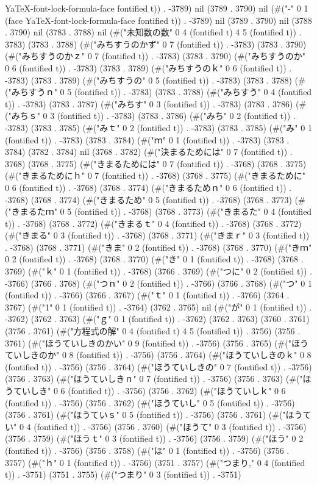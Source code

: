 YaTeX-font-lock-formula-face fontified t)) . -3789) nil (3789 . 3790) nil (#("-" 0 1 (face YaTeX-font-lock-formula-face fontified t)) . -3789) nil (3789 . 3790) nil (3788 . 3790) nil (3783 . 3788) nil (#("未知数の数" 0 4 (fontified t) 4 5 (fontified t)) . 3783) (3783 . 3788) (#("みちすうのかず" 0 7 (fontified t)) . -3783) (3783 . 3790) (#("みちすうのかｚ" 0 7 (fontified t)) . -3783) (3783 . 3790) (#("みちすうのか" 0 6 (fontified t)) . -3783) (3783 . 3789) (#("みちすうのｋ" 0 6 (fontified t)) . -3783) (3783 . 3789) (#("みちすうの" 0 5 (fontified t)) . -3783) (3783 . 3788) (#("みちすうｎ" 0 5 (fontified t)) . -3783) (3783 . 3788) (#("みちすう" 0 4 (fontified t)) . -3783) (3783 . 3787) (#("みちす" 0 3 (fontified t)) . -3783) (3783 . 3786) (#("みちｓ" 0 3 (fontified t)) . -3783) (3783 . 3786) (#("みち" 0 2 (fontified t)) . -3783) (3783 . 3785) (#("みｔ" 0 2 (fontified t)) . -3783) (3783 . 3785) (#("み" 0 1 (fontified t)) . -3783) (3783 . 3784) (#("ｍ" 0 1 (fontified t)) . -3783) (3783 . 3784) (3782 . 3784) nil (3768 . 3782) (#("決まるためには" 0 7 (fontified t)) . 3768) (3768 . 3775) (#("きまるためには" 0 7 (fontified t)) . -3768) (3768 . 3775) (#("きまるためにｈ" 0 7 (fontified t)) . -3768) (3768 . 3775) (#("きまるために" 0 6 (fontified t)) . -3768) (3768 . 3774) (#("きまるためｎ" 0 6 (fontified t)) . -3768) (3768 . 3774) (#("きまるため" 0 5 (fontified t)) . -3768) (3768 . 3773) (#("きまるたｍ" 0 5 (fontified t)) . -3768) (3768 . 3773) (#("きまるた" 0 4 (fontified t)) . -3768) (3768 . 3772) (#("きまるｔ" 0 4 (fontified t)) . -3768) (3768 . 3772) (#("きまる" 0 3 (fontified t)) . -3768) (3768 . 3771) (#("きまｒ" 0 3 (fontified t)) . -3768) (3768 . 3771) (#("きま" 0 2 (fontified t)) . -3768) (3768 . 3770) (#("きｍ" 0 2 (fontified t)) . -3768) (3768 . 3770) (#("き" 0 1 (fontified t)) . -3768) (3768 . 3769) (#("ｋ" 0 1 (fontified t)) . -3768) (3766 . 3769) (#("つに" 0 2 (fontified t)) . -3766) (3766 . 3768) (#("つｎ" 0 2 (fontified t)) . -3766) (3766 . 3768) (#("つ" 0 1 (fontified t)) . -3766) (3766 . 3767) (#("ｔ" 0 1 (fontified t)) . -3766) (3764 . 3767) (#("1" 0 1 (fontified t)) . -3764) (3762 . 3765) nil (#("が" 0 1 (fontified t)) . -3762) (3762 . 3763) (#("ｇ" 0 1 (fontified t)) . -3762) (3762 . 3763) (3760 . 3761) (3756 . 3761) (#("方程式の解" 0 4 (fontified t) 4 5 (fontified t)) . 3756) (3756 . 3761) (#("ほうていしきのかい" 0 9 (fontified t)) . -3756) (3756 . 3765) (#("ほうていしきのか" 0 8 (fontified t)) . -3756) (3756 . 3764) (#("ほうていしきのｋ" 0 8 (fontified t)) . -3756) (3756 . 3764) (#("ほうていしきの" 0 7 (fontified t)) . -3756) (3756 . 3763) (#("ほうていしきｎ" 0 7 (fontified t)) . -3756) (3756 . 3763) (#("ほうていしき" 0 6 (fontified t)) . -3756) (3756 . 3762) (#("ほうていしｋ" 0 6 (fontified t)) . -3756) (3756 . 3762) (#("ほうていし" 0 5 (fontified t)) . -3756) (3756 . 3761) (#("ほうていｓ" 0 5 (fontified t)) . -3756) (3756 . 3761) (#("ほうてい" 0 4 (fontified t)) . -3756) (3756 . 3760) (#("ほうて" 0 3 (fontified t)) . -3756) (3756 . 3759) (#("ほうｔ" 0 3 (fontified t)) . -3756) (3756 . 3759) (#("ほう" 0 2 (fontified t)) . -3756) (3756 . 3758) (#("ほ" 0 1 (fontified t)) . -3756) (3756 . 3757) (#("ｈ" 0 1 (fontified t)) . -3756) (3751 . 3757) (#("つまり," 0 4 (fontified t)) . -3751) (3751 . 3755) (#("つまり" 0 3 (fontified t)) . -3751) 